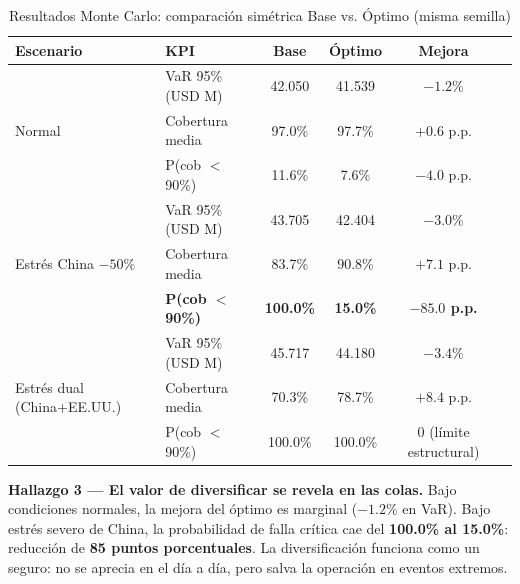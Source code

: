 \documentclass[11pt,a4paper]{article}
\begin{document}
\vspace{-0.3cm}
\begin{table}[H]
\centering\caption{Resultados Monte Carlo: comparación simétrica Base vs. Óptimo (misma semilla)}\label{tab:montecarlo}
\footnotesize
\begin{tabular}{llcccc}
\toprule
\textbf{Escenario} & \textbf{KPI} & \textbf{Base} & \textbf{Óptimo} & \textbf{Mejora} \\
\midrule
\multirow{3}{*}{Normal}
  & VaR 95\% (USD M)       & 42.050  & 41.539  & \textcolor{verdeclaro}{$-1.2\%$} \\
  & Cobertura media        & 97.0\%  & 97.7\%  & \textcolor{verdeclaro}{$+0.6$ p.p.} \\
  & P(cob $<$ 90\%)        & 11.6\%  & 7.6\%   & \textcolor{verdeclaro}{$-4.0$ p.p.} \\
\midrule
\multirow{3}{*}{Estrés China $-50\%$}
  & VaR 95\% (USD M)       & 43.705  & 42.404  & \textcolor{verdeclaro}{$-3.0\%$} \\
  & Cobertura media        & 83.7\%  & 90.8\%  & \textcolor{verdeclaro}{$+7.1$ p.p.} \\
  & \textbf{P(cob $<$ 90\%)} & \textbf{100.0\%} & \textbf{15.0\%} & \textcolor{verdeclaro}{\textbf{$-85.0$ p.p.}} \\
\midrule
\multirow{3}{*}{Estrés dual (China+EE.UU.)}
  & VaR 95\% (USD M)       & 45.717  & 44.180  & \textcolor{verdeclaro}{$-3.4\%$} \\
  & Cobertura media        & 70.3\%  & 78.7\%  & \textcolor{verdeclaro}{$+8.4$ p.p.} \\
  & P(cob $<$ 90\%)        & 100.0\% & 100.0\% & \textcolor{rojosuave}{$0$ (límite estructural)} \\
\bottomrule
\end{tabular}
\end{table}

\vspace{-0.3cm}
\begin{hallazgo}
\textbf{Hallazgo 3 --- El valor de diversificar se revela en las colas.} Bajo condiciones normales, la mejora del óptimo es marginal ($-1.2\%$ en VaR). Bajo estrés severo de China, la probabilidad de falla crítica cae del \textbf{100.0\% al 15.0\%}: reducción de \textbf{85 puntos porcentuales}. La diversificación funciona como un seguro: no se aprecia en el día a día, pero salva la operación en eventos extremos.
\end{hallazgo}

\end{document}
